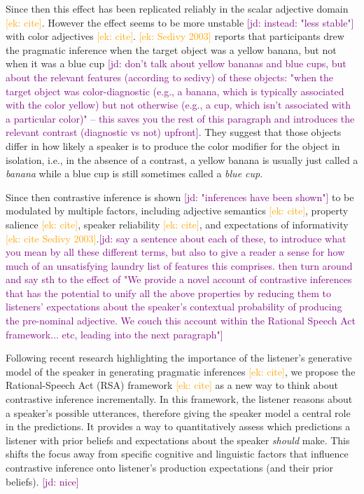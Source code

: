 \documentclass[10pt,letterpaper]{article}
\newcommand{\ek}[1]{\textcolor{Orange}{[ek: #1]}}
\newcommand{\jd}[1]{\textcolor{Purple}{[jd: #1]}}
\begin{document}
Since then this effect has been replicated reliably in the scalar adjective domain \ek{cite}. However the effect seems to be more unstable \jd{instead: "less stable"} with color adjectives \ek{cite}. \ek{Sedivy 2003} reports that participants drew the pragmatic inference when the target object was a yellow banana, but not when it was a blue cup \jd{don't talk about yellow bananas and blue cups, but about the relevant features (according to sedivy) of these objects: "when the target object was color-diagnostic (e.g., a banana, which is typically associated with the color yellow) but not otherwise (e.g., a cup, which isn't associated with a particular color)" -- this saves you the rest of this paragraph and introduces the relevant contrast (diagnostic vs not) upfront}. They suggest that those objects differ in how likely a speaker is to produce the color modifier for the object in isolation, i.e., in the absence of a contrast, a yellow banana is usually just called a \textit{banana} while a blue cup is still sometimes called a \textit{blue cup}.

Since then contrastive inference is shown \jd{"inferences have been shown"} to be modulated by multiple factors, including adjective semantics \ek{cite}, property salience \ek{cite}, speaker reliability \ek{cite}, and expectations of informativity \ek{cite Sedivy 2003}.\jd{say a sentence about each of these, to introduce what you mean by all these different terms, but also to give a reader a sense for how much of an unsatisfying laundry list of features this comprises. then turn around and say sth to the effect of "We provide a novel account of contrastive inferences that has the potential to unify all the above properties by reducing them to listeners' expectations about the speaker's contextual probability of producing the pre-nominal adjective. We couch this account within the Rational Speech Act framework... etc, leading into the next paragraph"}

Following recent research highlighting the importance of the listener’s generative model of the speaker in generating pragmatic inferences \ek{cite}, we propose the Rational-Speech Act (RSA) framework \ek{cite} as a new way to think about contrastive inference incrementally. In this framework, the listener reasons about a speaker's possible utterances, therefore giving the speaker model a central role in the predictions. It provides a way to quantitatively assess which predictions a listener with prior beliefs and expectations about the speaker \textit{should} make. This shifts the focus away from specific cognitive and linguistic factors that influence contrastive inference onto listener's production expectations (and their prior beliefs). \jd{nice}
\end{document}
